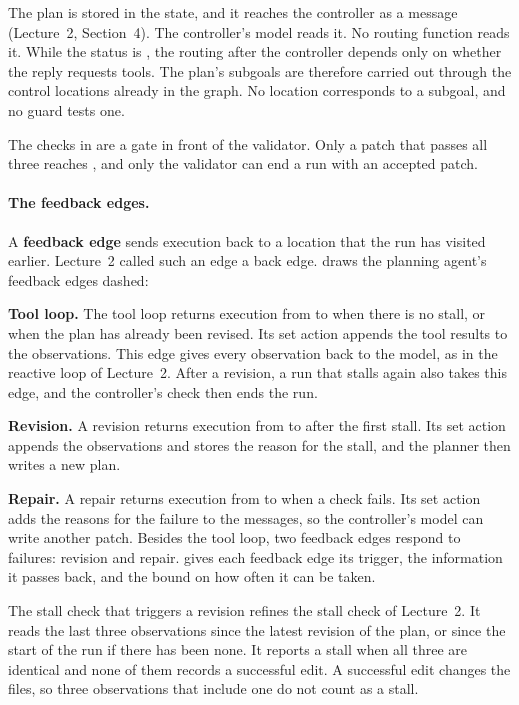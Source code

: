 The plan is stored in the state, and it reaches the controller as a message (Lecture~2, Section~4).
The controller's model reads it. No routing function reads it. While the status is
, the routing after the controller depends only on whether the reply requests
tools. The plan's subgoals are therefore carried out through the control locations already in the
graph. No location corresponds to a subgoal, and no guard tests one.

The checks in  are a gate in front of the validator. Only a patch that passes all
three reaches , and only the validator can end a run with an accepted patch.

\paragraph{The feedback edges.}
A \textbf{feedback edge} sends execution back to a location that the run has visited earlier.
Lecture~2 called such an edge a back edge.  draws the planning agent's
feedback edges dashed:
\bi
\item \textbf{Tool loop.} The tool loop returns execution from  to
 when there is no stall, or when the plan has already been revised. Its set
action appends the tool results to the observations. This edge gives every observation back to the
model, as in the reactive loop of Lecture~2. After a revision, a run that stalls again also takes
this edge, and the controller's check then ends the run.
\item \textbf{Revision.} A revision returns execution from  to  after
the first stall. Its set action appends the observations and stores the reason for the stall, and the
planner then writes a new plan.
\item \textbf{Repair.} A repair returns execution from  to  when a
check fails. Its set action adds the reasons for the failure to the messages, so the controller's
model can write another patch.
\ei
Besides the tool loop, two feedback edges respond to failures: revision and repair. 
gives each feedback edge its trigger, the information it passes back, and the bound on how often it
can be taken.

The stall check that triggers a revision refines the stall check of Lecture~2. It reads the last three
observations since the latest revision of the plan, or since the start of the run if there has been
none. It reports a stall when all three are identical and none of them records a successful edit. A
successful edit changes the files, so three observations that include one do not count as a stall.

